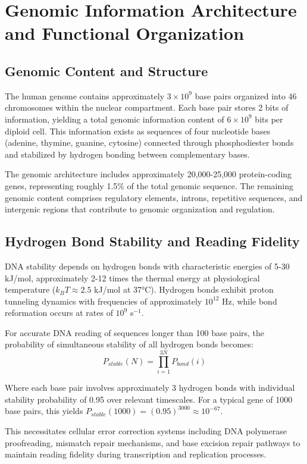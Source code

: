 \section{Genomic Information Architecture and Functional Organization}

\subsection{Genomic Content and Structure}

The human genome contains approximately $3 \times 10^9$ base pairs organized into 46 chromosomes within the nuclear compartment. Each base pair stores 2 bits of information, yielding a total genomic information content of $6 \times 10^9$ bits per diploid cell. This information exists as sequences of four nucleotide bases (adenine, thymine, guanine, cytosine) connected through phosphodiester bonds and stabilized by hydrogen bonding between complementary bases.

The genomic architecture includes approximately 20,000-25,000 protein-coding genes, representing roughly 1.5\% of the total genomic sequence. The remaining genomic content comprises regulatory elements, introns, repetitive sequences, and intergenic regions that contribute to genomic organization and regulation.

\subsection{Hydrogen Bond Stability and Reading Fidelity}

DNA stability depends on hydrogen bonds with characteristic energies of 5-30 kJ/mol, approximately 2-12 times the thermal energy at physiological temperature ($k_BT \approx 2.5$ kJ/mol at 37°C). Hydrogen bonds exhibit proton tunneling dynamics with frequencies of approximately $10^{12}$ Hz, while bond reformation occurs at rates of $10^9$ s$^{-1}$.

For accurate DNA reading of sequences longer than 100 base pairs, the probability of simultaneous stability of all hydrogen bonds becomes:
$$P_{stable}(N) = \prod_{i=1}^{3N} P_{bond}(i)$$

Where each base pair involves approximately 3 hydrogen bonds with individual stability probability of 0.95 over relevant timescales. For a typical gene of 1000 base pairs, this yields $P_{stable}(1000) = (0.95)^{3000} \approx 10^{-67}$.

This necessitates cellular error correction systems including DNA polymerase proofreading, mismatch repair mechanisms, and base excision repair pathways to maintain reading fidelity during transcription and replication processes.

